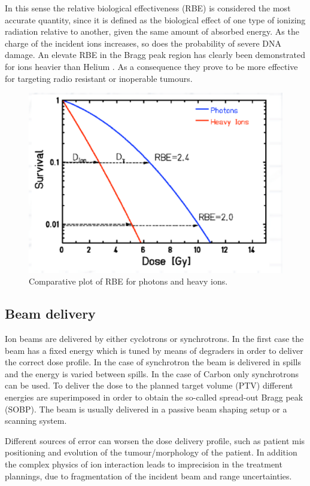 In this sense the relative biological effectiveness (RBE) is considered the most accurate quantity, since it is defined as the biological effect of one type of ionizing radiation relative to another, given the same amount of absorbed energy. As the charge of the incident ions increases, so does the probability of severe DNA damage. An elevate RBE in the Bragg peak region has clearly been demonstrated for ions heavier than Helium \cite{Linz2011}.
As a consequence they prove to be more effective for targeting radio resistant or inoperable tumours.

\begin{figure}  
\centering
\includegraphics[width=12cm]{Pictures/Chapter_1/rbe.pdf}
\caption[RBE comparison]{Comparative plot of RBE for photons and heavy ions.}
\label{fig:rbe}
\end{figure}

\subsection{Beam delivery}

Ion beams are delivered by either cyclotrons or synchrotrons. In the first case the beam has a fixed energy which is tuned by means of degraders in order to deliver the correct dose profile. In the case of synchrotron the beam is delivered in spills and the energy is varied between spills. In the case of Carbon only synchrotrons can be used.
To deliver the dose to the planned target volume (PTV) different energies are superimposed in order to obtain the so-called spread-out Bragg peak (SOBP). The beam is usually delivered in a passive beam shaping setup or a scanning system. 

Different sources of error can worsen the dose delivery profile, such as patient mis positioning and evolution of the tumour/morphology of the patient. In addition the complex physics of ion interaction leads to  imprecision in the treatment plannings, due to fragmentation of the incident beam and range uncertainties.

